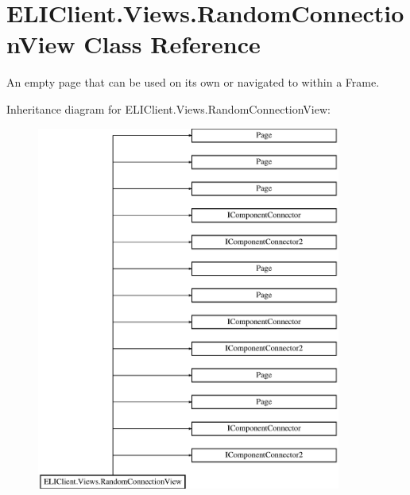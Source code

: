 \hypertarget{class_e_l_i_client_1_1_views_1_1_random_connection_view}{}\section{E\+L\+I\+Client.\+Views.\+Random\+Connection\+View Class Reference}
\label{class_e_l_i_client_1_1_views_1_1_random_connection_view}


An empty page that can be used on its own or navigated to within a Frame.  


Inheritance diagram for E\+L\+I\+Client.\+Views.\+Random\+Connection\+View\+:\begin{figure}[H]
\begin{center}
\leavevmode
\includegraphics[height=12.000000cm]{da/d3c/class_e_l_i_client_1_1_views_1_1_random_connection_view}
\end{center}
\end{figure}
